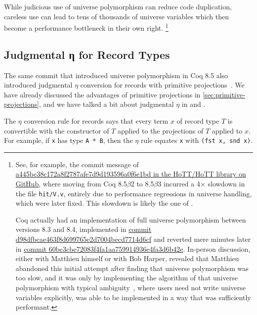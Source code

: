 While judicious use of universe polymorphism can reduce code duplication, careless use can lead to tens of thousands of universe variables which then become a performance bottleneck in their own right.%
\footnote{%
  See, for example, the commit message of \href{https://github.com/HoTT/HoTT/commit/a445bc38c172a8f2787afe7d9d193596a0f6e1bd}{a445bc38c172a8f2787afe7d9d193596a0f6e1bd in the HoTT/HoTT library on GitHub}, where moving from Coq 8.5$\beta$2 to 8.5$\beta$3 incurred a 4$\times$ slowdown in the file \texttt{hit/V.v}, entirely due to performance regressions in universe handling, which were later fixed.
  This slowdown is likely the one of .

  Coq actually had an implementation of full universe polymorphism between versions 8.3 and 8.4, implemented in \href{https://github.com/coq/coq/commit/d98dfbcae463f8d699765e2d7004becd7714d6cf}{commit d98dfbcae463f8d699765e2d7004becd7714d6cf} and reverted mere minutes later in \href{https://github.com/coq/coq/commit/60bc3cbe72083f4fa1aa759914936e4fa3d6b42e}{commit 60bc3cbe72083f4fa1aa759914936e4fa3d6b42e}.
  In-person discussion, either with Matthieu himself or with Bob Harper, revealed that Matthieu abandoned this initial attempt after finding that universe polymorphism was too slow, and it was only by implementing the algorithm of \textcite{Harper1991107} that universe polymorphism with typical ambiguity~\cite{Universe2012Shulman,Typical1966Specker,Harper1991107}, where users need not write universe variables explicitly, was able to be implemented in a way that was sufficiently performant.%
}

\subsection{Judgmental η for Record Types}\label{sec:fixes:theory:record-eta}\label{sec:record-eta}
The same commit that introduced universe polymorphism in Coq 8.5 also introduced judgmental $\eta$ conversion for records with primitive projections~\cite{coq-commit-polyproj}.
We have already discussed the advantages of primitive projections in \autoref{sec:primitive-projections}, and we have talked a bit about judgmental $\eta$ in  and .

The $\eta$ conversion rule for records says that every term $x$ of record type $T$ is convertible with the constructor of $T$ applied to the projections of $T$ applied to $x$.
For example, if \texttt{x} has type \texttt{A * B}, then the $\eta$ rule equates \texttt{x} with \texttt{(fst x, snd x)}.

